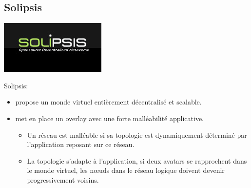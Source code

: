 \documentclass{beamer}
\begin{document}
  \subsection{Solipsis}

  \begin{frame}
	\begin{center}
	\includegraphics[scale=0.35]{./Ressources/Images/solipsis.png}\\
	\end{center}
	\vspace{4mm}
	Solipsis:\\
	\begin{itemize}
		\item propose un monde virtuel entièrement décentralisé et scalable.\\
		\item met en place un overlay avec une forte malléabilité applicative.\\
		\tiny{
			\begin{itemize}
				\item Un réseau est malléable si sa topologie est dynamiquement déterminé par l'application reposant sur ce réseau.\\
				\item La topologie s'adapte à l'application, si deux avatars se rapprochent dans le monde virtuel, les nœuds dans le réseau logique doivent devenir progressivement voisins. \\
			\end{itemize}
		}
	\end{itemize}
  \end{frame}
\end{document}
